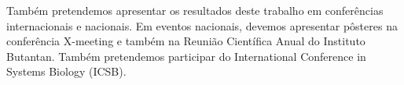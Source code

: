 \documentclass[12pt]{article}
\begin{document}
Também pretendemos apresentar os resultados deste trabalho
em conferências internacionais e nacionais. Em eventos nacionais, 
devemos apresentar pôsteres na conferência X-meeting e também na Reunião
Científica Anual do Instituto Butantan. Também pretendemos participar
do International Conference in Systems Biology (ICSB).

 

\end{document}
